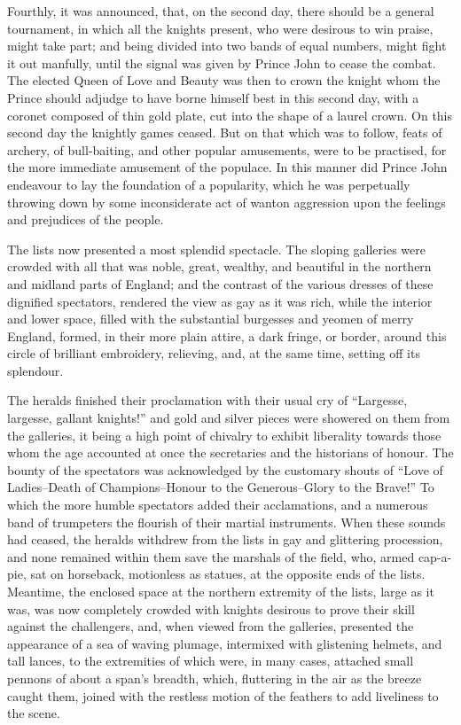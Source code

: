 Fourthly, it was announced, that, on the second day, there should be a
general tournament, in which all the knights present, who were desirous
to win praise, might take part; and being divided into two bands of
equal numbers, might fight it out manfully, until the signal was given
by Prince John to cease the combat. The elected Queen of Love and Beauty
was then to crown the knight whom the Prince should adjudge to have
borne himself best in this second day, with a coronet composed of thin
gold plate, cut into the shape of a laurel crown. On this second day the
knightly games ceased. But on that which was to follow, feats of
archery, of bull-baiting, and other popular amusements, were to be
practised, for the more immediate amusement of the populace. In this
manner did Prince John endeavour to lay the foundation of a popularity,
which he was perpetually throwing down by some inconsiderate act of
wanton aggression upon the feelings and prejudices of the people.

The lists now presented a most splendid spectacle. The sloping galleries
were crowded with all that was noble, great, wealthy, and beautiful in
the northern and midland parts of England; and the contrast of the
various dresses of these dignified spectators, rendered the view as gay
as it was rich, while the interior and lower space, filled with the
substantial burgesses and yeomen of merry England, formed, in their more
plain attire, a dark fringe, or border, around this circle of brilliant
embroidery, relieving, and, at the same time, setting off its splendour.

The heralds finished their proclamation with their usual cry of
``Largesse, largesse, gallant knights!'' and gold and silver pieces were
showered on them from the galleries, it being a high point of chivalry
to exhibit liberality towards those whom the age accounted at once the
secretaries and the historians of honour. The bounty of the spectators
was acknowledged by the customary shouts of ``Love of Ladies--Death of
Champions--Honour to the Generous--Glory to the Brave!'' To which the
more humble spectators added their acclamations, and a numerous band of
trumpeters the flourish of their martial instruments. When these sounds
had ceased, the heralds withdrew from the lists in gay and glittering
procession, and none remained within them save the marshals of the
field, who, armed cap-a-pie, sat on horseback, motionless as statues, at
the opposite ends of the lists. Meantime, the enclosed space at the
northern extremity of the lists, large as it was, was now completely
crowded with knights desirous to prove their skill against the
challengers, and, when viewed from the galleries, presented the
appearance of a sea of waving plumage, intermixed with glistening
helmets, and tall lances, to the extremities of which were, in many
cases, attached small pennons of about a span's breadth, which,
fluttering in the air as the breeze caught them, joined with the
restless motion of the feathers to add liveliness to the scene.

